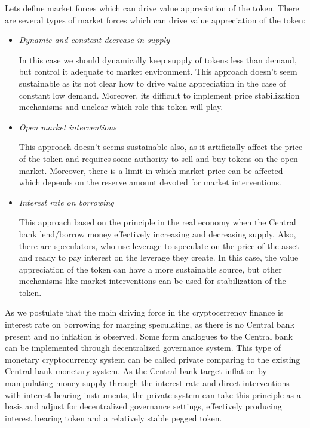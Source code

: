 \documentclass[12pt, a4paper, twocolumn]{article}
\begin{document}
Lets define market forces which can drive value appreciation of the token. There are several types of market forces which can drive value appreciation of the token:

\begin{itemize}
\item \textit{Dynamic and constant decrease in supply} 
 
In this case we should dynamically keep supply of tokens less than demand, but control it adequate to market environment. This approach doesn't seem sustainable as its not clear how to drive value appreciation in the case of constant low demand. Moreover, its difficult to implement price stabilization mechanisms and unclear which role this token will play.
\item \textit{Open market interventions}

This approach doesn't seems sustainable also, as it artificially affect the price of the token and requires some authority to sell and buy tokens on the open market. Moreover, there is a limit in which market price can be affected which depends on the reserve amount devoted for market interventions.
\item \textit{Interest rate on borrowing}

This approach based on the principle in the real economy when the Central bank lend/borrow money effectively increasing and decreasing supply. Also, there are speculators, who use leverage to speculate on the price of the asset and ready to pay interest on the leverage they create. In this case, the value appreciation of the token can have a more sustainable source, but other mechanisms like market interventions can be used for stabilization of the token.
\end{itemize}

As we postulate that the main driving force in the cryptocerrency finance is interest rate on borrowing for marging speculating, as there is no Central bank present and no inflation is observed. Some form analogues to the Central bank can be implemented through decentralized governance system. This type of monetary cryptocurrency system can be called private comparing to the existing Central bank monetary system.
As the Central bank target inflation by manipulating money supply through the interest rate and direct interventions with interest bearing instruments, the private system can take this principle as a basis and adjust for decentralized governance settings, effectively producing interest bearing token and a relatively stable pegged token.
\end{document}
